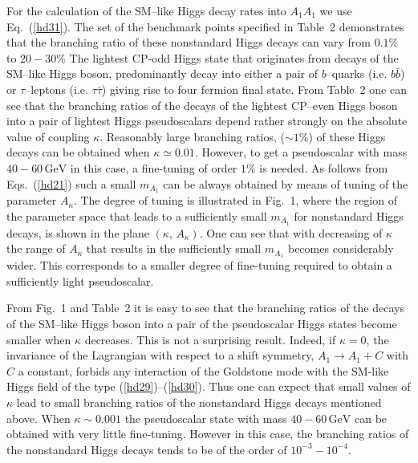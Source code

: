 \documentclass[12pt,a4paper]{article}
\begin{document}
For the calculation of the SM--like Higgs decay rates into $A_1 A_1$
we use Eq.~(\ref{hd31}). The set of the benchmark points specified in
Table~2 demonstrates that the branching ratio of these nonstandard
Higgs decays can vary from $0.1\%$ to $20-30\%$ The lightest CP-odd
Higgs state that originates from decays of the SM--like Higgs
boson, predominantly decay into either a pair of $b$--quarks
(i.e. $b\bar{b}$) or $\tau$--leptons (i.e. $\tau\bar{\tau}$) giving
rise to four fermion final state.  From Table~2 one can see that the
branching ratios of the decays of the lightest CP--even Higgs boson
into a pair of lightest Higgs pseudoscalars depend rather strongly on
the absolute value of coupling $\kappa$. Reasonably large branching
ratios, ($\sim 1\%$) of these Higgs decays can be obtained when
$\kappa\simeq 0.01$. However, to get a pseudoscalar with mass
$40-60\,\mbox{GeV}$ in this case, a fine-tuning of order $1\%$ is
needed. As follows from Eqs.~(\ref{hd21}) such a small $m_{A_1}$ can be
always obtained by means of tuning of the parameter $A_{\kappa}$. The
degree of tuning is illustrated in Fig.~1, where the region of the
parameter space that leads to a sufficiently small $m_{A_1}$ for
nonstandard Higgs decays, is shown in the plane $(\kappa,\,
A_{\kappa})$.  One can see that with decreasing of $\kappa$ the range
of $A_{\kappa}$ that results in the sufficiently small $m_{A_1}$
becomes considerably wider.  This corresponds to a smaller degree of
fine-tuning required to obtain a sufficiently light pseudoscalar.

From Fig.~1 and Table~2 it is easy to see that the branching ratios of
the decays of the SM--like Higgs boson into a pair of the pseudoscalar
Higgs states become smaller when $\kappa$ decreases.  This is not
a surprising result. Indeed, if $\kappa=0$, the invariance of the
Lagrangian with respect to a shift symmetry, $A_1\to A_1 + C$ with
$C$ a constant, forbids any interaction of the Goldstone mode
with the SM-like Higgs field of the type
(\ref{hd29})--(\ref{hd30}). Thus one can expect that small values of
$\kappa$ lead to small branching ratios of the nonstandard Higgs
decays mentioned above.  When $\kappa\sim 0.001$ the pseudoscalar
state with mass $40-60\,\mbox{GeV}$ can be obtained with very little
fine-tuning. However in this case, the branching ratios of the
nonstandard Higgs decays tends to be of the order of
$10^{-3}-10^{-4}$.
\end{document}

